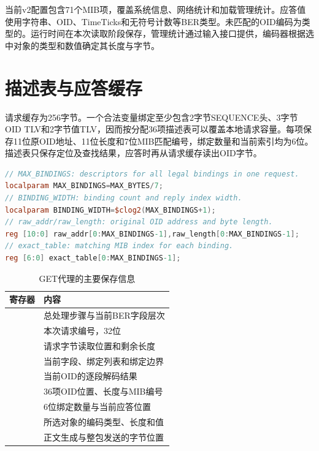 当前v2配置包含71个MIB项，覆盖系统信息、网络统计和加载管理统计。应答值使用字符串、OID、TimeTicks和无符号计数等BER类型。未匹配的OID编码为类型的。运行时间在本次读取阶段保存，管理统计通过输入接口提供，编码器根据选中对象的类型和数值确定其长度与字节。

\section{描述表与应答缓存}
请求缓存为256字节。一个合法变量绑定至少包含2字节SEQUENCE头、3字节OID TLV和2字节值TLV，因而按分配36项描述表可以覆盖本地请求容量。每项保存11位原OID地址、11位长度和7位MIB匹配编号，绑定数量和当前索引均为6位。描述表只保存定位及查找结果，应答时再从请求缓存读出OID字节。

\par\noindent\begin{minipage}{\linewidth}
\begin{lstlisting}[language=Verilog,caption={OID描述表的实际容量组织}]
// MAX_BINDINGS: descriptors for all legal bindings in one request.
localparam MAX_BINDINGS=MAX_BYTES/7;
// BINDING_WIDTH: binding count and reply index width.
localparam BINDING_WIDTH=$clog2(MAX_BINDINGS+1);
// raw_addr/raw_length: original OID address and byte length.
reg [10:0] raw_addr[0:MAX_BINDINGS-1],raw_length[0:MAX_BINDINGS-1];
// exact_table: matching MIB index for each binding.
reg [6:0] exact_table[0:MAX_BINDINGS-1];
\end{lstlisting}
\end{minipage}\par

\begin{table}[htbp]\centering\small
\caption{GET代理的主要保存信息}
\begin{tabularx}{\linewidth}{@{}l Y@{}}\toprule 寄存器 & 内容\\\midrule
{} & 总处理步骤与当前BER字段层次\\
 & 本次请求编号，32位\\
 & 请求字节读取位置和剩余长度\\
 & 当前字段、绑定列表和绑定边界\\
 & 当前OID的逐段解码结果\\
 & 36项OID位置、长度与MIB编号\\
 & 6位绑定数量与当前应答位置\\
 & 所选对象的编码类型、长度和值\\
 & 正文生成与整包发送的字节位置\\\bottomrule
\end{tabularx}\end{table}


